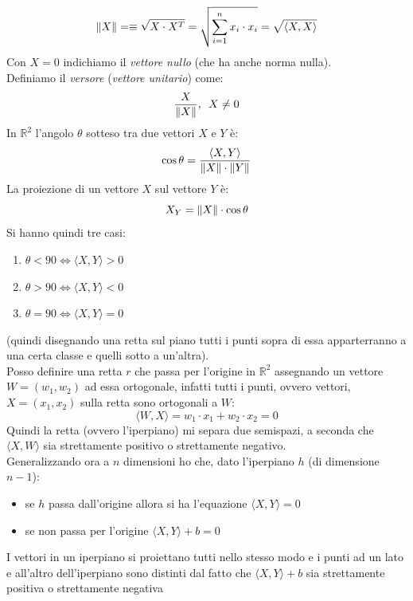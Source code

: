 \begin{shaded}
									      			      			\[\norm{X}=\equiv\sqrt{X\cdot X^T}=\sqrt{\sum_{i=1}^n x_i\cdot
									      			      					x_i}=\sqrt{\langle X, X\rangle}\] 
									      			      				Con $X=0$ indichiamo il \textit{vettore nullo} (che ha anche norma nulla).\\
									      			      				Definiamo il \textit{versore} (\textit{vettore unitario}) come:
									      			      				\[\frac{X}{\norm{X}},\,\,\, X\neq 0\]
									      			      				In $\mathbb{R}^2$ l'angolo $\theta$ sotteso tra due vettori $X$ e $Y$ è:
									      			      				\[\cos\theta=\frac{\langle X, Y\rangle}{\norm{X}\cdot \norm{Y}}\]
									      			      				La proiezione di un vettore $X$ sul vettore $Y$ è:
									      			      				\[X_Y=\norm{X}\cdot \cos\theta\]
									      			      				Si hanno quindi tre casi:
									      			      				\begin{enumerate}
									      			      					\item $\theta < 90 \iff \langle X, Y\rangle >0$
									      			      					\item $\theta > 90 \iff \langle X, Y\rangle <0$
									      			      					\item $\theta = 90 \iff \langle X, Y\rangle =0$
									      			      				\end{enumerate}
									      			      				(quindi disegnando una retta sul piano tutti i punti sopra di essa
									      			      				apparterranno a una certa classe e quelli sotto a un'altra).\\
									      			      				Posso definire una retta $r$ che passa per l'origine in  $\mathbb{R}^2$
									      			      				assegnando un vettore $W=(w_1, w_2)$ ad essa ortogonale, infatti tutti i punti,
									      			      				ovvero vettori, $X=(x_1, x_2)$ sulla retta sono ortogonali a $W$:
									      			      				\[\langle W, X\rangle=w_1\cdot x_1+w_2\cdot x_2=0 \]
									      			      				Quindi la retta (ovvero l'iperpiano) mi separa due semispazi, a seconda che
									      			      				$\langle X, W\rangle$ sia strettamente positivo o strettamente negativo.\\
									      			      				Generalizzando ora a $n$ dimensioni ho che, dato l'iperpiano $h$ (di
									      			      				dimensione $n-1$):
									      			      				\begin{itemize}
									      			      					\item se $h$ passa dall'origine allora si ha l'equazione $\langle X, Y\rangle
									      			      					      =0$
									      			      					\item se non passa per l'origine $\langle X, Y\rangle +b=0$ 
									      			      					          
									      			      				\end{itemize}
									      			      				I vettori in un iperpiano si proiettano tutti nello stesso modo e i punti ad
									      			      				un lato e all'altro dell'iperpiano sono distinti dal fatto che $\langle
									      			      				X, Y\rangle +b$ sia strettamente positiva o strettamente negativa
									      			      				\end{shaded}
